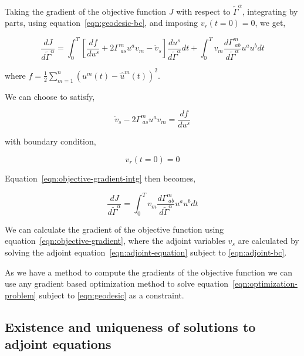 \documentclass[a4paper,11pt]{elsarticle}
\begin{document}
Taking the gradient of the objective function $J$ with respect to
$\tilde{\Gamma}^{\alpha}$, integrating by parts, using
equation~\ref{eqn:geodesic-bc}, and imposing $v_{r}(t = 0) = 0$, we
get,

\begin{equation}\label{eqn:objective-gradient-intg}
\frac{d J}{d \tilde{\Gamma}^{\alpha}} = \int_{0}^{T} \left[
  \frac{df}{du^{s}} + 2 \Gamma^{m}_{\;as} u^{a} v_{m} - \dot{v}_{s}
  \right] \frac{d u^{s}}{d \tilde{\Gamma}^{\alpha}} dt + \int_{0}^{T}
v_{m} \frac{d \Gamma^{m}_{\;ab}}{d \tilde{\Gamma}^{\alpha}} u^{a} u^{b}
dt
\end{equation}

where $f = \frac{1}{2} \sum_{m=1}^{n} (u^{m}(t) -
\hat{u}^{m}(t))^2$. 

We can choose to satisfy,

\begin{equation}\label{eqn:adjoint-equation}
\dot{v}_{s} - 2 \Gamma^{m}_{\;as} u^{a} v_{m} = \frac{df}{du^{s}}
\end{equation}

with boundary condition,

\begin{equation}\label{eqn:adjoint-bc}
v_{r}( t = 0 ) = 0  
\end{equation}

Equation~\ref{eqn:objective-gradient-intg} then becomes,

\begin{equation}\label{eqn:objective-gradient}
\frac{d J}{d \tilde{\Gamma}^{\alpha}} = \int_{0}^{T} v_{m} \frac{d
  \Gamma^{m}_{\;ab}}{d \tilde{\Gamma}^{\alpha}} u^{a} u^{b} dt
\end{equation}

We can calculate the gradient of the objective function using
equation~\ref{eqn:objective-gradient}, where the adjoint variables
$v_{s}$ are calculated by solving the adjoint
equation~\ref{eqn:adjoint-equation} subject to \ref{eqn:adjoint-bc}.

As we have a method to compute the gradients of the objective function
we can use any gradient based optimization method to solve
equation~\ref{eqn:optimization-problem} subject to \ref{eqn:geodesic}
as a constraint.

\subsection{Existence and uniqueness of solutions to adjoint equations}
\label{subsection:existence-adjoint}
\end{document}
